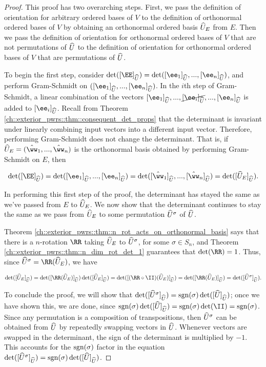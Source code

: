 \begin{proof}
   This proof has two overarching steps. First, we pass the definition of orientation for arbitrary ordered bases of $V$ to the definition of orthonormal ordered bases of $V$ by obtaining an orthonormal ordered basis $\widehat{U}_E$ from $E$. Then we pass the definition of orientation for orthonormal ordered bases of $V$ that are not permutations of $\widehat{U}$ to the definition of orientation for orthonormal ordered bases of $V$ that are permutations of $\widehat{U}$.
   
   To begin the first step, consider $\det([\EE]_{\hU}) = \det([\ee_1]_{\hU}, ..., [\ee_n]_{\hU})$, and perform Gram-Schmidt on $([\ee_1]_{\hU}, ..., [\ee_n]_{\hU})$. In the $i$th step of Gram-Schmidt, a linear combination of the vectors $[\ee_1]_{\hU}, ..., \cancel{[\ee_i]_{\hU}}, ..., [\ee_n]_{\hU}$ is added to $[\ee_i]_{\hU}$. Recall from Theorem \ref{ch::exterior_pwrs::thm::consequent_det_props} that the determinant is invariant under linearly combining input vectors into a different input vector. Therefore, performing Gram-Schmidt does not change the determinant. That is, if $\hU_E = (\hww_1, ..., \hww_n)$ is the orthonormal basis obtained by performing Gram-Schmidt on $E$, then 
   
   \begin{align*}
       \det([\EE]_{\hU}) = \det([\ee_1]_{\hU}, ..., [\ee_n]_{\hU}) = \det([\hww_1]_{\hU}, ..., [\hww_n]_{\hU})
       =
       \det([\hU_E]_{\hU}).
   \end{align*}
   
   In performing this first step of the proof, the determinant has stayed the same as we've passed from $E$ to $\widehat{U}_E$. We now show that the determinant continues to stay the same as we pass from  $\widehat{U}_E$ to some permutation $\widehat{U}^\sigma$ of $\widehat{U}$.
   
   Theorem \ref{ch::exterior_pwrs::thm::n_rot_acts_on_orthonormal_basis} says that there is a $n$-rotation $\RR$ taking $\widehat{U}_E$ to $\widehat{U}^\sigma$, for some $\sigma \in S_n$, and Theorem \ref{ch::exterior_pwrs::thm::n_dim_rot_det_1} guarantees that $\det(\RR) = 1$. Thus, since $\hU^\sigma = \RR(\hU_E)$, we have
   
   \begin{align*}
        \det([\hU_E]_{\hU}) 
        = \det([\RR(\hU_E)]_{\hU}) \det([\hU_E]_{\hU})
        = \det([(\RR \circ \II)(\hU_E)]_{\hU})
        = \det([\RR(\hU_E)]_{\hU})
        = \det([\hU^\sigma]_{\hU}).
   \end{align*}
   
   To conclude the proof, we will show that $\det([\widehat{U}^\sigma]_{\widehat{U}}) = \text{sgn}(\sigma) \det([\widehat{U}]_{\widehat{U}})$; once we have shown this, we are done, since $\sgn(\sigma) \det([\hU]_{\hU}) = \sgn(\sigma) \det(\II) = \sgn(\sigma)$. Since any permutation is a composition of transpositions, then $\widehat{U}^\sigma$ can be obtained from $\widehat{U}$ by repeatedly swapping vectors in $\widehat{U}$. Whenever vectors are swapped in the determinant, the sign of the determinant is multiplied by $-1$. This accounts for the $\text{sgn}(\sigma)$ factor in the equation $\det([\widehat{U}^\sigma]_{\widehat{U}}) = \text{sgn}(\sigma) \det([\widehat{U}]_{\widehat{U}})$.
\end{proof}

